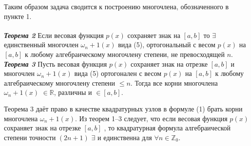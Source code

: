 \documentclass[14pt,a4paper,titlepage]{extarticle}
\begin{document}
Таким образом задача сводится к построению многочлена, обозначенного в пункте 1.
\\
\\
\textit{{\textbf{Теорема 2}}}
Если весовая функция $p(x)$ сохраняет знак на  $\left[  a, b\right] $ то $\exists$ единственный многочлен $\omega_n+1 (x)$ вида (5), ортогональный с весом $p(x)$ на $\left[  a, b\right] $ к любому алгебраическому многочлену
степени, не превосходящей $n$.
\\
\textit{{\textbf{Теорема 3}}}
Пусть весовая функция $p(x)$ сохраняет знак на отрезке $\left[  a, b\right] $ и многочлен $\omega_n+1 (x)$ вида (5) ортогонален с весом $p(x)$ на $\left[  a, b\right] $ к
любому алгебраическому многочлену степени $\leqslant n$. Тогда все корни многочлена $\omega_n+1 (x)$ $\in \mathbb{R}$, различны и $\in \left[  a, b\right] $.

Теорема 3 даёт право в качестве квадратурных узлов в формуле (1) брать корни
многочлена $\omega_n+1 (x)$.
Из теорем 1–3 следует, что если весовая функция $p(x)$ сохраняет знак на отрезке
$\left[  a, b\right] $ , то квадратурная формула алгебраической степени точности $(2n+1)$ $\exists$ и
единственна для $\forall n \in \mathbb{Z}_0$.
\end{document}
